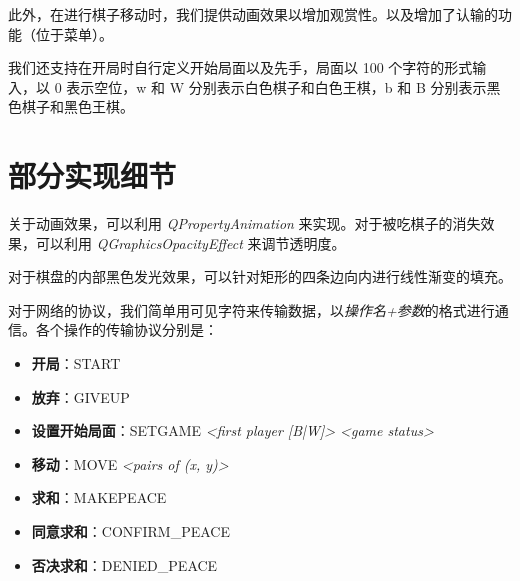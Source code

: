 \documentclass[11pt,a4paper]{article}
\begin{document}
此外，在进行棋子移动时，我们提供动画效果以增加观赏性。以及增加了认输的功能（位于菜单）。

我们还支持在开局时自行定义开始局面以及先手，局面以 100 个字符的形式输入，以 0 表示空位，w 和 W 分别表示白色棋子和白色王棋，b 和 B 分别表示黑色棋子和黑色王棋。

\section{部分实现细节}
关于动画效果，可以利用 {\it QPropertyAnimation} 来实现。对于被吃棋子的消失效果，可以利用 {\it QGraphicsOpacityEffect} 来调节透明度。

对于棋盘的内部黑色发光效果，可以针对矩形的四条边向内进行线性渐变的填充。

对于网络的协议，我们简单用可见字符来传输数据，以{\it 操作名+参数}的格式进行通信。各个操作的传输协议分别是：

\begin{itemize}
	\item {\bf 开局}：START
	\item {\bf 放弃}：GIVEUP
	\item {\bf 设置开始局面}：SETGAME {\it <first player [B|W]> <game status>}
	\item {\bf 移动}：MOVE {\it <length of moving trace> <pairs of (x, y)>}
	\item {\bf 求和}：MAKEPEACE
	\item {\bf 同意求和}：CONFIRM\_PEACE
	\item {\bf 否决求和}：DENIED\_PEACE
\end{itemize}
\end{document}
